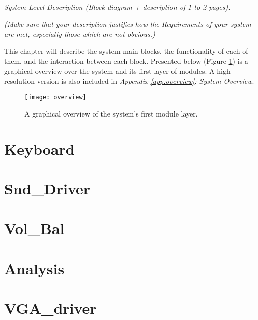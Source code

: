 \emph{System Level Description (Block diagram + description of 1 to 2 pages).}

\emph{(Make sure that your description justifies how the Requirements of your system are met, especially those which are not obvious.)}


This chapter will describe the system main blocks, the functionality of each of them, and the interaction between each block. Presented below (Figure \ref{fig:overview}) is a graphical overview over the system and its first layer of modules. A high resolution version is also included in \emph{Appendix \ref{app:overview}: System Overview}.

\begin{figure}[H]
  \centering
  \texttt{[image: overview]}
  \caption{A graphical overview of the system's first module layer.}
  \label{fig:overview}
\end{figure}

\section{Keyboard}\label{sec:keyboard}


\section{Snd\_Driver}\label{sec:snddriver}


\section{Vol\_Bal}\label{sec:volbal}


\section{Analysis}\label{sec:analysis}


\section{VGA\_driver}\label{sec:vgadriver}


